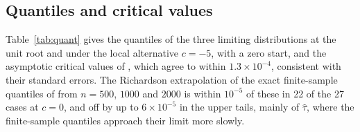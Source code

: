 \documentclass[ecta,nameyear,final]{econsocart}
\theoremstyle{plain}
\theoremstyle{definition}
\begin{document}
\subsection{Quantiles and critical values}
\label{sec:quant}

Table~\ref{tab:quant} gives the quantiles of the three limiting distributions at the unit root and under the local alternative $c=-5$, with a zero start, and the asymptotic critical values of \cite{MacKinnon2010}, which agree to within $1.3\times10^{-4}$, consistent with their standard errors.  The Richardson extrapolation of the exact finite-sample quantiles of \cite{BaoBrodaKan2026} from $n=500$, $1000$ and $2000$ is within $10^{-5}$ of these in 22 of the 27 cases at $c=0$, and off by up to $6\times10^{-5}$ in the upper tails, mainly of $\hat\tau$, where the finite-sample quantiles approach their limit more slowly.
\end{document}

